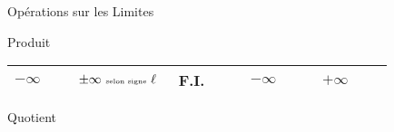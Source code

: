 \documentclass{cours}
\begin{document}
\begin{Gpartie}{Opérations sur les Limites}
\begin{Spartie}{Produit}
\begin{table}[H]
{\begin{tabular}{ p{0.15\linewidth} *{4}{M{0.17\linewidth} }}
                        $-\infty$   & $\pm\infty~\text{\tiny{selon signe}}~\ell$    & F.I.& $-\infty$                                   & $+\infty$                                     \\ \bottomrule
                    \end{tabular}
                }
            \end{table}
        \end{Spartie}
        \pagebreak
        \begin{Spartie}{Quotient}
            \begin{table}[H]%
                \centering {}
\end{table}
\end{Spartie}
\end{Gpartie}
\end{document}

